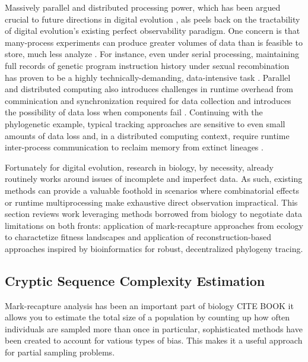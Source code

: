 Massively parallel and distributed processing power, which has been argued crucial to future directions in digital evolution \citep{moreno2022best,ackleyTODO}, als peels back on the tractability of digital evolution's existing perfect observability paradigm.
One concern is that many-process experiments can produce greater volumes of data than is feasible to store, much less analyze \citep{klasky2021data}.
For instance, even under serial processing, maintaining full records of genetic program instruction history under sexual recombination has proven to be a highly technically-demanding, data-intensive task \citep{mcphee2016using}.
Parallel and distributed computing also introduces challenges in runtime overhead from comminication and synchronization required for data collection and introduces the possibility of data loss when components fail \citep{snir2014addressing}.
Continuing with the phylogenetic example, typical tracking approaches are sensitive to even small amounts of data loss and, in a distributed computing context, require runtime inter-process communication to reclaim memory from extinct lineages \citep{moreno2024algorithms}.

Fortunately for digital evolution, research in biology, by necessity, already routinely works around issues of incomplete and imperfect data.
As such, existing methods can provide a valuable foothold in scenarios where combinatorial effects or runtime multiprocessing make exhaustive direct observation impractical.
This section reviews work leveraging methods borrowed from biology to negotiate data limitations on both fronts: application of mark-recapture approaches from ecology to charactetize fitness landscapes and application of reconstruction-based approaches inspired by bioinformatics for robust, decentralized phylogeny tracing.

\subsection{Cryptic Sequence Complexity Estimation}

Mark-recapture analysis has been an important part of biology CITE BOOK
it allows you to estimate the total size of a population by counting up how often individuals are sampled more than once
in particular, sophisticated methods have been created to account for vatious types of bias.
This makes it a useful approach for  partial sampling problems.

